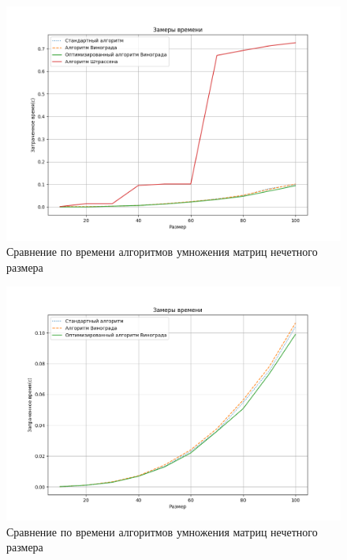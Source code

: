 \begin{figure}[H]
	\begin{center}
		\includegraphics[scale=0.6]{img/graph_odd1.png}
	\end{center}
	\captionsetup{justification=centering}
	\caption{Сравнение по времени алгоритмов умножения матриц нечетного размера}
	\label{img:graph_odd1}
\end{figure}

\begin{figure}[H]
	\begin{center}
		\includegraphics[scale=0.6]{img/graph_odd2.png}
	\end{center}
	\captionsetup{justification=centering}
	\caption{Сравнение по времени алгоритмов умножения матриц нечетного размера}
	\label{img:graph_odd2}
\end{figure}

